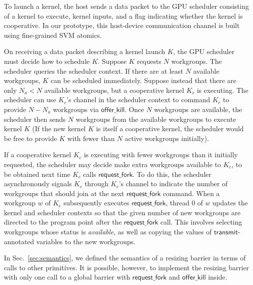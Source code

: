 \documentclass[sigconf]{acmart}
\newcommand{\KC}{\mathit{KC}}
\newcommand{\mysec}{Sec.~}
\newcommand{\transmit}{\mathsf{transmit}}
\newcommand{\offerfork}{\mathsf{request\_fork}}
\newcommand{\offerkill}{\mathsf{offer\_kill}}
\begin{document}
{
%
To launch a kernel, the host sends a data packet to the GPU scheduler
consisting of a kernel to execute, kernel inputs, and a flag
indicating whether the kernel is cooperative. In our prototype,
this host-device communication channel is built using fine-grained SVM
atomics.

On receiving a data packet describing a kernel launch $K$, the GPU
scheduler must decide how to schedule $K$. Suppose $K$ requests $N$
workgroups. The scheduler queries the scheduler context.  If there are
at least $N$ available workgroups, $K$ can be scheduled
immediately. Suppose instead that there are only $N_a < N$ available
workgroups, but a cooperative kernel $K_c$ is executing. The scheduler
can use $K_c$'s channel in the scheduler context to command $K_c$ to
provide $N - N_a$ workgroups via $\offerkill$.  Once $N$ workgroups
are available,
the scheduler then sends $N$ workgroups from the available workgroups
to execute kernel $K$
(If the new kernel $K$ is itself a cooperative kernel, the scheduler
would be free to provide $K$ with fewer than $N$ active workgroups
initially).

If a cooperative kernel $K_c$ is executing with fewer workgroups than
it initially requested, the scheduler may decide make extra workgroups
available to $K_c$, to be obtained next time $K_c$ calls $\offerfork$.
To do this, the scheduler asynchronously signals $K_c$ through $K_c$'s
channel to indicate the number of workgroups that should join at the
next $\offerfork$ command.  When a workgroup $w$ of $K_c$ subsequently
executes $\offerfork$, thread 0 of $w$ updates the kernel and
scheduler contexts so that the given number of new workgroups are
directed to the program point after the $\offerfork$ call.  This
involves selecting workgroups whose status is \emph{available}, as
well as copying the values of $\transmit$-annotated variables to the
new workgroups.

%
In \mysec\ref{sec:semantics}, we defined the semantics of a resizing
barrier in terms of calls to other primitives.  It is possible,
however, to implement the resizing barrier with only one call to a
global barrier with $\offerfork$ and $\offerkill$ inside.

}
\end{document}
